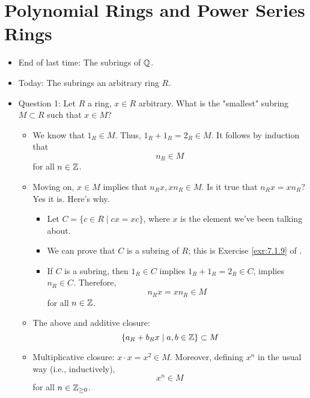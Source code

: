 \documentclass[../notes.tex]{subfiles}
\begin{document}
\section{Polynomial Rings and Power Series Rings}
\begin{itemize}
    \item {}End of last time: The subrings of $\mathbb{Q}$.
    \item Today: The subrings an arbitrary ring $R$.
    \item Question 1: Let $R$ a ring, $x\in R$ arbitrary. What is the "smallest" subring $M\subset R$ such that $x\in M$?
    \begin{itemize}
        \item We know that $1_R\in M$. Thus, $1_R+1_R=2_R\in M$. It follows by induction that
        \begin{equation*}
            n_R \in M
        \end{equation*}
        for all $n\in\mathbb{Z}$.
        \item Moving on, $x\in M$ implies that $n_Rx,xn_R\in M$. Is it true that $n_Rx=xn_R$? Yes it is. Here's why.
        \begin{itemize}
            \item Let $C=\{c\in R\mid cx=xc\}$, where $x$ is the element we've been talking about.
            \item We can prove that $C$ is a subring of $R$; this is Exercise \ref{exr:7.1.9} of \textcite{bib:DummitFoote}.
            \item If $C$ is a subring, then $1_R\in C$ implies $1_R+1_R=2_R\in C$, implies $n_R\in C$. Therefore,
            \begin{equation*}
                n_Rx=xn_R \in M
            \end{equation*}
            for all $n\in\mathbb{Z}$.
        \end{itemize}
        \item The above and additive closure:
        \begin{equation*}
            \{a_R+b_Rx\mid a,b\in\mathbb{Z}\} \subset M
        \end{equation*}
        \item Multiplicative closure: $x\cdot x=x^2\in M$. Moreover, defining $x^n$ in the usual way (i.e., inductively),
        \begin{equation*}
            x^n \in M
        \end{equation*}
        for all $n\in{\mathbb{Z}_{\geq 0}}$.
        \begin{itemize}

\end{itemize}
\end{itemize}
\end{itemize}
\end{document}
